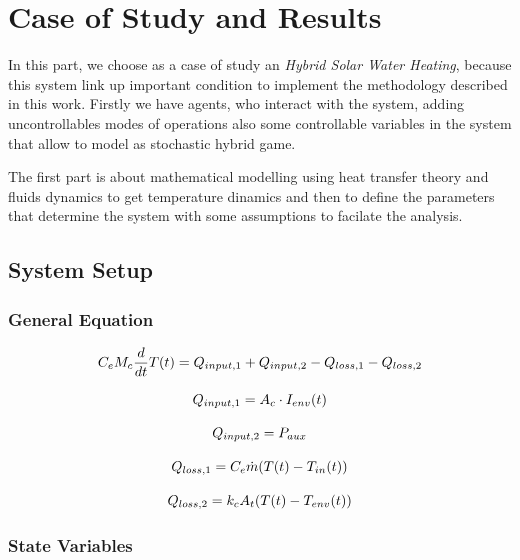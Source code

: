 
\chapter{Case of Study and Results}

\label{ch:proposal}
In this part, we choose as a case of study an \emph{Hybrid Solar Water
Heating}, because this system link up important condition to implement the
methodology described in this work. Firstly we have agents, who interact with 
the system, adding uncontrollables modes of operations also some controllable
variables in the system that allow to model as stochastic hybrid game.

The first part is about mathematical modelling using heat transfer
theory and fluids dynamics to get temperature dinamics and then 
to define the parameters that determine the system with some
assumptions to facilate the analysis.
\section{System Setup}

%
\subsection{General Equation}

\begin{equation}
C_eM_{c}\frac{d}{dt}T(t) =  Q_{input,1} + Q_{input,2} - Q_{loss,1} -  Q_{loss,2}
\end{equation}

\begin{equation}
    Q_{input,1} =   A_c\cdot I_{env}(t)
\end{equation}

\begin{equation}
    Q_{input,2} =   P_{aux}
\end{equation}

\begin{equation}
    Q_{loss,1} =  C_e \dot{m} (T(t)-T_{in}(t))
\end{equation}

\begin{equation}
    Q_{loss,2} =  k_c A_t (T(t)-T_{env}(t))
\end{equation}

\subsection{State Variables}

